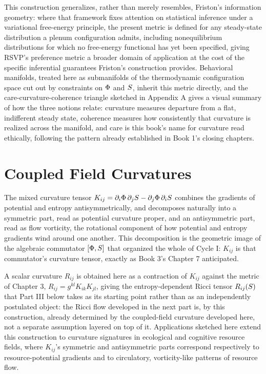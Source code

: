 This construction generalizes, rather than merely resembles, Friston's information geometry: where that framework fixes attention on statistical inference under a variational free-energy principle, the present metric is defined for any steady-state distribution a plenum configuration admits, including nonequilibrium distributions for which no free-energy functional has yet been specified, giving RSVP's preference metric a broader domain of application at the cost of the specific inferential guarantees Friston's construction provides. Behavioral manifolds, treated here as submanifolds of the thermodynamic configuration space cut out by constraints on $\Phi$ and $S$, inherit this metric directly, and the care-curvature-coherence triangle sketched in Appendix A gives a visual summary of how the three notions relate: curvature measures departure from a flat, indifferent steady state, coherence measures how consistently that curvature is realized across the manifold, and care is this book's name for curvature read ethically, following the pattern already established in Book 1's closing chapters.

\chapter{Coupled Field Curvatures}

The mixed curvature tensor $K_{ij} = \partial_i \Phi \, \partial_j S - \partial_j \Phi \, \partial_i S$ combines the gradients of potential and entropy antisymmetrically, and decomposes naturally into a symmetric part, read as potential curvature proper, and an antisymmetric part, read as flow vorticity, the rotational component of how potential and entropy gradients wind around one another. This decomposition is the geometric image of the algebraic commutator $[\Phi, S]$ that organized the whole of Cycle I: $K_{ij}$ is that commutator's curvature tensor, exactly as Book 3's Chapter 7 anticipated.

A scalar curvature $R_{ij}$ is obtained here as a contraction of $K_{ij}$ against the metric of Chapter 3, $R_{ij} = g^{kl} K_{ik} K_{jl}$, giving the entropy-dependent Ricci tensor $R_{ij}(S)$ that Part III below takes as its starting point rather than as an independently postulated object: the Ricci flow developed in the next part is, by this construction, already determined by the coupled-field curvature developed here, not a separate assumption layered on top of it. Applications sketched here extend this construction to curvature signatures in ecological and cognitive resource fields, where $K_{ij}$'s symmetric and antisymmetric parts correspond respectively to resource-potential gradients and to circulatory, vorticity-like patterns of resource flow.

